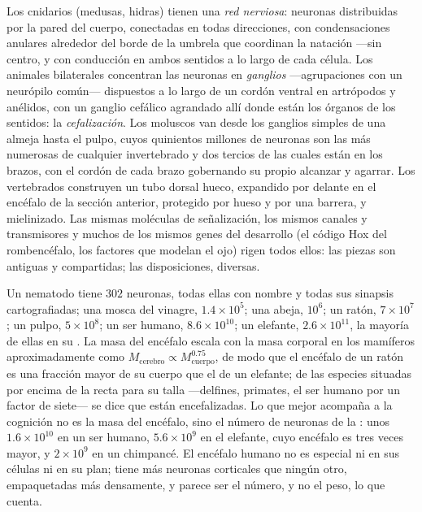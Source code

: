 \begin{definition}\label{def:b3:nervous-systems:comparative}
Los cnidarios (medusas, hidras) tienen una \emph{red nerviosa}:
neuronas distribuidas por la pared del cuerpo, conectadas en todas
direcciones, con condensaciones anulares alrededor del borde de la
umbrela que coordinan la natación ---sin centro, y con conducción en
ambos sentidos a lo largo de cada célula. Los animales bilaterales
concentran las neuronas en \emph{ganglios} ---agrupaciones con un
neurópilo común--- dispuestos a lo largo de un cordón ventral en
artrópodos y anélidos, con un ganglio cefálico agrandado allí donde
están los órganos de los sentidos: la \emph{cefalización}. Los moluscos
van desde los ganglios simples de una almeja hasta el pulpo, cuyos
quinientos millones de neuronas son las más numerosas de cualquier
invertebrado y dos tercios de las cuales están en los brazos, con el
cordón de cada brazo gobernando su propio alcanzar y agarrar. Los
vertebrados construyen un tubo dorsal hueco, expandido por delante en
el encéfalo de la sección anterior, protegido por hueso y por una
barrera, y mielinizado. Las mismas moléculas de señalización, los
mismos canales y transmisores y muchos de los mismos genes del
desarrollo (el código Hox del rombencéfalo, los factores que modelan el
ojo) rigen todos ellos: las piezas son antiguas y compartidas; las
disposiciones, diversas.
\end{definition}

\begin{example}\label{ex:b3:nervous-systems:counts}
Un nematodo tiene $302$ neuronas, todas ellas con nombre y todas sus
sinapsis cartografiadas; una mosca del vinagre, $1.4\times 10^{5}$; una
abeja, $10^{6}$; un ratón, $7\times 10^{7}$; un pulpo,
$5\times 10^{8}$; un ser humano, $8.6\times
10^{10}$; un elefante, $2.6\times 10^{11}$, la mayoría de ellas en su
. La masa del encéfalo escala con la masa corporal en los
mamíferos aproximadamente como
$M_{\text{cerebro}} \propto M_{\text{cuerpo}}^{0.75}$, de modo que el
encéfalo de un ratón es una fracción mayor de su cuerpo que el de un
elefante; de las especies situadas por encima de la recta para su talla
---delfines, primates, el ser humano por un factor de siete--- se dice
que están encefalizadas. Lo que mejor acompaña a la cognición no es la
masa del encéfalo, sino el número de neuronas de la :
unos $1.6\times 10^{10}$ en un ser humano, $5.6\times 10^{9}$ en el
elefante, cuyo encéfalo es tres veces mayor, y $2\times 10^{9}$ en un
chimpancé. El encéfalo humano no es especial ni en sus células ni en su
plan; tiene más neuronas corticales que ningún otro, empaquetadas más
densamente, y parece ser el número, y no el peso, lo que cuenta.
\end{example}

